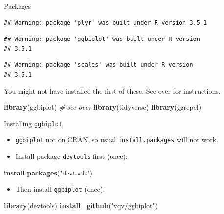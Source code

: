 \documentclass[ignorenonframetext,]{beamer}
\newenvironment{Shaded}{\begin{snugshade}}{\end{snugshade}}
\newcommand{\CommentTok}[1]{\textcolor[rgb]{0.56,0.35,0.01}{\textit{#1}}}
\newcommand{\KeywordTok}[1]{\textcolor[rgb]{0.13,0.29,0.53}{\textbf{#1}}}
\newcommand{\NormalTok}[1]{#1}
\newcommand{\StringTok}[1]{\textcolor[rgb]{0.31,0.60,0.02}{#1}}
\providecommand{\tightlist}{%
  \setlength{\itemsep}{0pt}\setlength{\parskip}{0pt}}
\begin{document}
\begin{frame}[fragile]{Packages}
\protect\hypertarget{packages-9}{}

\begin{verbatim}
## Warning: package 'plyr' was built under R version 3.5.1
\end{verbatim}

\begin{verbatim}
## Warning: package 'ggbiplot' was built under R version
## 3.5.1
\end{verbatim}

\begin{verbatim}
## Warning: package 'scales' was built under R version
## 3.5.1
\end{verbatim}

You might not have installed the first of these. See over for
instructions.

\begin{Shaded}
\begin{Highlighting}[]
\KeywordTok{library}\NormalTok{(ggbiplot) }\CommentTok{# see over}
\KeywordTok{library}\NormalTok{(tidyverse)}
\KeywordTok{library}\NormalTok{(ggrepel)}
\end{Highlighting}
\end{Shaded}

\end{frame}

\begin{frame}[fragile]{Installing \texttt{ggbiplot}}
\protect\hypertarget{installing-ggbiplot-1}{}

\begin{itemize}
\item
  \texttt{ggbiplot} not on CRAN, so usual \texttt{install.packages} will
  not work.
\item
  Install package \texttt{devtools} first (once):
\end{itemize}

\begin{Shaded}
\begin{Highlighting}[]
\KeywordTok{install.packages}\NormalTok{(}\StringTok{"devtools"}\NormalTok{)}
\end{Highlighting}
\end{Shaded}

\begin{itemize}
\tightlist
\item
  Then install \texttt{ggbiplot} (once):
\end{itemize}

\begin{Shaded}
\begin{Highlighting}[]
\KeywordTok{library}\NormalTok{(devtools)}
\KeywordTok{install_github}\NormalTok{(}\StringTok{"vqv/ggbiplot"}\NormalTok{)}
\end{Highlighting}
\end{Shaded}

\end{frame}
\end{document}

